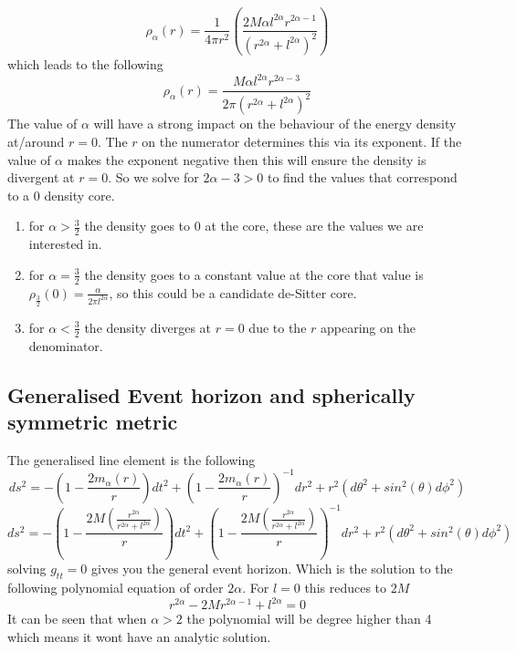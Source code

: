 \documentclass[a4paper,11pt]{article}
\begin{document}
\begin{equation}
\rho_{\alpha}(r)=\frac{1}{4 \pi r^2}(\frac{2M \alpha l^{2 \alpha} r^{2 \alpha-1} }{(r^{2 \alpha}+l^{2 \alpha})^2})
\end{equation}
which leads to the following
\begin{equation}
\rho_{\alpha}(r)=\frac{M \alpha l^{2 \alpha} r^{2 \alpha-3} }{2 \pi (r^{2 \alpha}+l^{2 \alpha})^2}
\end{equation}
The value of $\alpha$ will have a strong impact on the behaviour of the energy density at/around $r=0$. The $r$ on the numerator determines this via its exponent. If the value of $\alpha$ makes the exponent negative then this will ensure the density is divergent at $r=0$. So we solve for $2 \alpha -3 > 0$ to find the values that correspond to a $0$ density core. 
\begin{enumerate}
    \item for $\alpha > \frac{3}{2}$ the density goes to 0 at the core, these are the values we are interested in.
    \item for $\alpha = \frac{3}{2}$ the density goes to a constant value at the core that value is $\rho_{\frac{3}{2}}(0) = \frac{\alpha}{2 \pi l^{2 \alpha}}$, so this could be a candidate de-Sitter core.
    \item for $\alpha < \frac{3}{2}$ the density diverges at $r=0$ due to the $r$ appearing on the denominator.
\end{enumerate}
\subsection{Generalised Event horizon and spherically symmetric metric}
The generalised line element is the following
\begin{equation}
    ds^2=-(1-\frac{2m_{\alpha}(r)}{r})dt^2+(1-\frac{2m_{\alpha}(r)}{r})^{-1}dr^2+r^2(d\theta^2+sin^2(\theta)d\phi^2)
\end{equation}
\begin{equation}
    ds^2=-(1-\frac{2M (\frac{r^{2 \alpha}}{r^{2 \alpha}+l^{2 \alpha}})}{r})dt^2+(1-\frac{2M (\frac{r^{2 \alpha}}{r^{2 \alpha}+l^{2 \alpha}})}{r})^{-1}dr^2+r^2(d\theta^2+sin^2(\theta)d\phi^2)
\end{equation}
 solving $g_{tt}=0$ gives you the general event horizon. Which is the solution to the following polynomial equation of order $2 \alpha$. For $l=0$ this reduces to $2M$
\begin{equation}
r^{2 \alpha}-2Mr^{2 \alpha - 1}+l^{2 \alpha}=0
\end{equation}
It can be seen that when $\alpha > 2 $ the polynomial will be degree higher than 4 which means it wont have an analytic solution.
\end{document}
